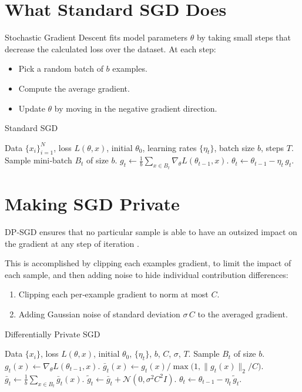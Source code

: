 \documentclass{article}
\begin{document}
\section{What Standard SGD Does}
Stochastic Gradient Descent fits model parameters $\theta$ by taking small steps that decrease the calculated loss over the dataset.  At each step:
\begin{itemize}
  \item Pick a random batch of $b$ examples.
  \item Compute the average gradient.
  \item Update $\theta$ by moving in the negative gradient direction.
\end{itemize}

\begin{algorithm}
\caption{Standard SGD}\label{alg:sgd}
\begin{algorithmic}[1]
\REQUIRE Data $\{x_i\}_{i=1}^N$, loss $L(\theta,x)$, initial $\theta_0$, 
learning rates $\{\eta_t\}$, batch size $b$, steps $T$.
  \STATE Sample mini‑batch $B_t$ of size $b$.
  \STATE $g_t \leftarrow \frac1b\sum_{x\in B_t}\nabla_\theta L(\theta_{t-1},x)$.
  \STATE $\theta_t \leftarrow \theta_{t-1} - \eta_t\,g_t$.
\ENDFOR
\end{algorithmic}
\end{algorithm}

\section{Making SGD Private}
DP‑SGD ensures that no particular sample is able to have an outsized impact on the gradient at any step of iteration \cite{DR14}. 

This is accomplished by clipping each examples gradient, to limit the impact of each sample, and then adding noise to hide individual contribution differences:
\begin{enumerate}
  \item Clipping each per‐example gradient to norm at most $C$.
  \item Adding Gaussian noise of standard deviation $\sigma\,C$ to the averaged gradient.
\end{enumerate}

\begin{algorithm}
\caption{Differentially Private SGD}\label{alg:dpsgd}
\begin{algorithmic}[1]
\REQUIRE Data $\{x_i\}$, loss $L(\theta,x)$, initial $\theta_0$, $\{\eta_t\}$, $b$, $C$, $\sigma$, $T$.
  \STATE Sample $B_t$ of size $b$.
    \STATE $g_t(x)\leftarrow\nabla_\theta L(\theta_{t-1},x)$.
    \STATE $\bar g_t(x)\leftarrow g_t(x)/\max\!\bigl(1,\|g_t(x)\|_2/C\bigr)$.
  \ENDFOR
  \STATE $\bar g_t \leftarrow \frac1b\sum_{x\in B_t}\bar g_t(x)$.
  \STATE $\widetilde g_t \leftarrow \bar g_t + \mathcal{N}(0,\sigma^2 C^2 I)$.
  \STATE $\theta_t \leftarrow \theta_{t-1} - \eta_t\,\widetilde g_t$.
\ENDFOR
\end{algorithmic}
\end{algorithm}
\end{document}
